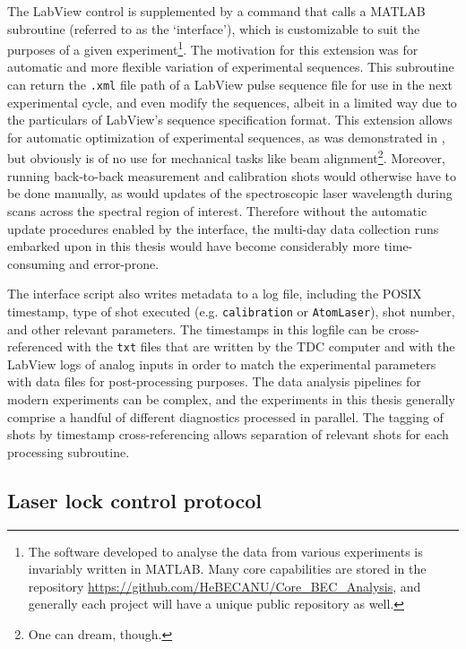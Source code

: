 	The LabView control is supplemented by a command that calls a MATLAB subroutine (referred to as the `interface'), which is customizable to suit the purposes of a given experiment\footnote{The software developed to analyse the data from various experiments is invariably written in MATLAB.	Many core capabilities are stored in the repository \url{https://github.com/HeBECANU/Core_BEC_Analysis}, and generally each project will have a unique public repository as well.}.
	The motivation for this extension was for automatic and more flexible variation of experimental sequences. 
	This subroutine can return the \verb|.xml| file path of a LabView pulse sequence file for use in the next experimental cycle, and even modify the sequences, albeit in a limited way due to the particulars of LabView's sequence specification format.
	This extension allows for automatic optimization of experimental sequences, as was demonstrated in \cite{Henson18_ML}, but obviously is of no use for mechanical tasks like beam alignment\footnote{One can dream, though.}.
	Moreover, running back-to-back measurement and calibration shots would otherwise have to be done manually, as would updates of the spectroscopic laser wavelength during scans across the spectral region of interest.
	Therefore without the automatic update procedures enabled by the interface, the multi-day data collection runs embarked upon in this thesis would have become considerably more time-consuming and error-prone. 
	
	The interface script also writes metadata to a log file, including the POSIX timestamp, type of shot executed (e.g.
	\verb|calibration| or \verb|AtomLaser|), shot number, and other relevant parameters.
	The timestamps in this logfile can be cross-referenced with the \verb|txt| files that are written by the TDC computer and with the LabView logs of analog inputs in order to match the experimental parameters with data files for post-processing purposes.
	The data analysis pipelines for modern experiments can be complex, and the experiments in this thesis generally comprise a handful of different diagnostics processed in parallel.
	The tagging of shots by timestamp cross-referencing allows separation of relevant shots for each processing subroutine.
	
\subsection{Laser lock control protocol}

